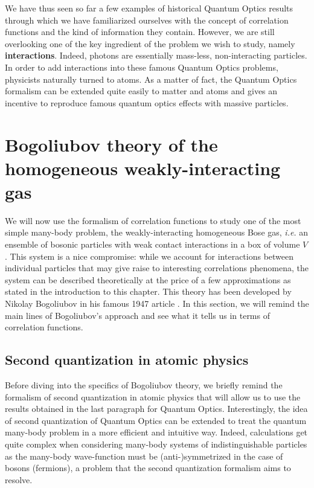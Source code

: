 We have thus seen so far a few examples of historical Quantum Optics results through which we have familiarized ourselves with the concept of correlation functions and the kind of information they contain. However, we are still overlooking one of the key ingredient of the problem we wish to study, namely \textbf{interactions}. Indeed, photons are essentially mass-less, non-interacting particles. In order to add interactions into these famous Quantum Optics problems, physicists naturally turned to atoms. As a matter of fact, the Quantum Optics formalism can be extended quite easily to matter and atoms and gives an incentive to reproduce famous quantum optics effects with massive particles.
  

\section{Bogoliubov theory of the homogeneous weakly-interacting gas}

We will now use the formalism of correlation functions to study one of the most simple many-body problem, the weakly-interacting homogeneous Bose gas, {\it i.e.} an ensemble of bosonic particles with weak contact interactions in a box of volume $V$. This system is a nice compromise: while we account for interactions between individual particles that may give raise to interesting correlations phenomena, the system can be described theoretically at the price of a few approximations as stated in the introduction to this chapter. This theory has been developed by Nikolay Bogoliubov in his famous 1947 article \cite{bogoliubov1947}. In this section, we will remind the main lines of Bogoliubov's approach and see what it tells us in terms of correlation functions.

\subsection{Second quantization in atomic physics}

Before diving into the specifics of Bogoliubov theory, we briefly remind the formalism of second quantization in atomic physics that will allow us to use the results obtained in the last paragraph for Quantum Optics. Interestingly, the idea of second quantization of Quantum Optics can be extended to treat the quantum many-body problem in a more efficient and intuitive way. Indeed, calculations get quite complex when considering many-body systems of indistinguishable particles as the many-body wave-function must be (anti-)symmetrized in the case of bosons (fermions), a problem that the second quantization formalism aims to resolve.

